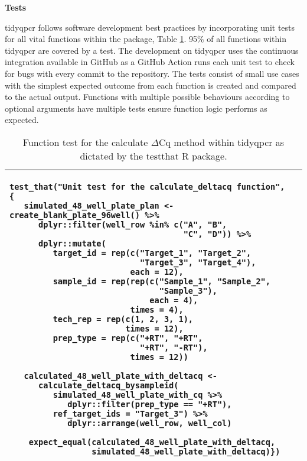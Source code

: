 \documentclass[../main.tex]{subfiles}
\begin{document}
\newpage
\textbf{Tests}

tidyqpcr follows software development best practices by incorporating unit tests for all vital functions within the package, Table \ref{function-tests}. 
95\% of all functions within tidyqpcr are covered by a test. 
The development on tidyqpcr uses the continuous integration available in GitHub as a GitHub Action runs each unit test to check for bugs with every commit to the repository. 
The tests consist of small use cases with the simplest expected outcome from each function is created and compared to the actual output. 
Functions with multiple possible behaviours according to optional arguments have multiple tests ensure function logic performs as expected. 

\begin{table}
\centering
\begin{tabular}{| m{10cm} |}
\hline
\begin{lstlisting}[style=mystyle]
test_that("Unit test for the calculate_deltacq function",
{
   simulated_48_well_plate_plan <- create_blank_plate_96well() %>%
      dplyr::filter(well_row %in% c("A", "B",
                                    "C", "D")) %>%
      dplyr::mutate(
         target_id = rep(c("Target_1", "Target_2",
                           "Target_3", "Target_4"),
                         each = 12),
         sample_id = rep(rep(c("Sample_1", "Sample_2",
                               "Sample_3"),
                             each = 4),
                         times = 4),
         tech_rep = rep(c(1, 2, 3, 1),
                        times = 12),
         prep_type = rep(c("+RT", "+RT",
                           "+RT", "-RT"),
                         times = 12))

   calculated_48_well_plate_with_deltacq <- 
      calculate_deltacq_bysampleid(
         simulated_48_well_plate_with_cq %>%
            dplyr::filter(prep_type == "+RT"), 
         ref_target_ids = "Target_3") %>%
            dplyr::arrange(well_row, well_col)

    expect_equal(calculated_48_well_plate_with_deltacq,        
                 simulated_48_well_plate_with_deltacq)})
\end{lstlisting} \\
\hline
\end{tabular}
\caption*{Function test for the calculate $\Delta$Cq method within tidyqpcr as dictated by the testthat R package.}
\label{function-tests}
\end{table}
\end{document}
